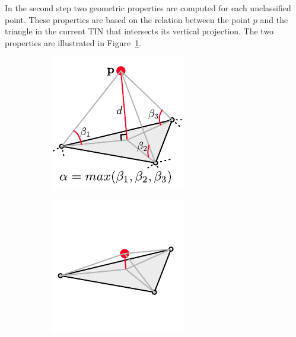 In the second step two geometric properties are computed for each unclassified point.
These properties are based on the relation between the point $p$ and the triangle in the current TIN that intersects its vertical projection. 
The two properties are illustrated in Figure~\ref{fig:ground-filtering:symbols}.
\begin{figure}
  \centering
  \begin{subfigure}[b]{0.3\linewidth}
    \centering
    \includegraphics[width=\textwidth]{figs/groundfilter-symbols.pdf}
    \caption{}
    \label{fig:ground-filtering:symbols}
  \end{subfigure}
  \begin{subfigure}[b]{0.3\linewidth}
    \centering
    \includegraphics[width=\textwidth]{figs/groundfilter-ground.pdf}

\end{subfigure}
\end{figure}
